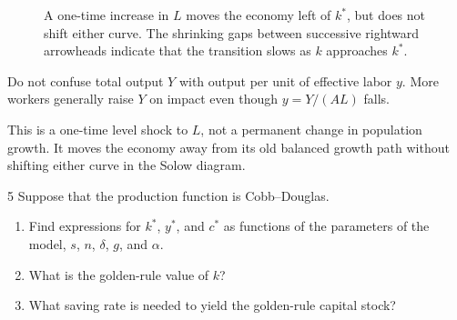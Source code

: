 \begin{solution}
\begin{figure}[H]
    \vspace{1pt}

    \caption{A one-time increase in \(L\) moves the economy left of \(k^*\), but
    does not shift either curve. The shrinking gaps between successive rightward
    arrowheads indicate that the transition slows as \(k\) approaches \(k^*\).}
\end{figure}
\end{solution}

\begin{note}[Aggregation]
    Do not confuse total output \(Y\) with output per unit of effective labor \(y\).
    More workers generally raise \(Y\) on impact even though \(y=Y/(AL)\) falls.
\end{note}

\begin{note}
    This is a one-time level shock to \(L\), not a permanent change in population
    growth. It moves the economy away from its old balanced growth path without
    shifting either curve in the Solow diagram.
\end{note}

\begin{problem}{5}
Suppose that the production function is Cobb--Douglas.
\begin{enumerate}[label=(\alph*)]
    \item Find expressions for \(k^*\), \(y^*\), and \(c^*\) as functions of the parameters
    of the model, \(s\), \(n\), \(\delta\), \(g\), and \(\alpha\).
    \item What is the golden-rule value of \(k\)?
    \item What saving rate is needed to yield the golden-rule capital stock?
\end{enumerate}
\end{problem}

